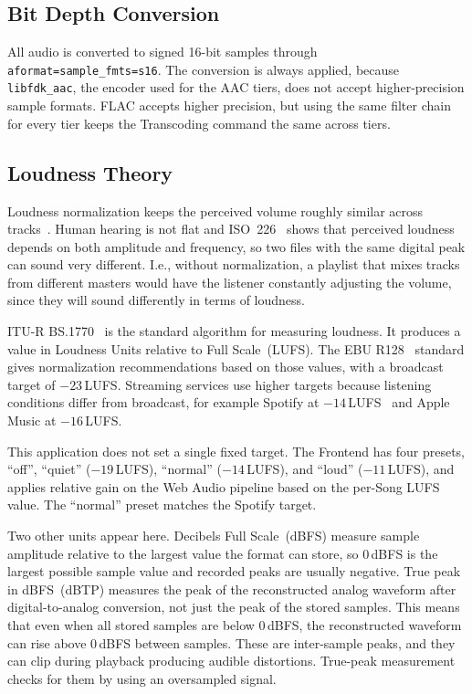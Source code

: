 \subsection{Bit Depth Conversion}
All audio is converted to signed 16-bit samples through
\texttt{aformat=sample\_fmts=s16}. The conversion is always applied,
because \texttt{libfdk\_aac}, the encoder used for the AAC tiers,
does not accept higher-precision sample formats. FLAC accepts higher
precision, but using the same filter chain for every tier keeps the
Transcoding command the same across tiers.

\subsection{Loudness Theory}
Loudness normalization keeps the perceived volume roughly similar across
tracks~\parencite{audio_normalization}. Human hearing is not flat and
ISO~226~\parencite{iso226} shows that perceived loudness depends on both amplitude
and frequency, so two files with the same digital peak can sound
very different. I.e., without normalization, a playlist that mixes tracks
from different masters would have the listener constantly adjusting the volume, since they will
sound differently in terms of loudness.

ITU-R BS.1770~\parencite{itu_bs1770} is the standard algorithm for measuring
loudness. It produces a value in Loudness Units relative to Full
Scale~(LUFS). The EBU R128~\parencite{ebu_r128} standard gives normalization
recommendations based on those values, with a broadcast target of
\(-23\)\,LUFS\@. Streaming services use higher targets because listening
conditions differ from broadcast, for example Spotify at
\(-14\)\,LUFS~\parencite{spotify_loudness} and Apple Music at
\(-16\)\,LUFS\@.~\parencite{apple_music_loudness}

This application does not set a single fixed target. The Frontend has
four presets, ``off'', ``quiet'' (\(-19\)\,LUFS), ``normal''
(\(-14\)\,LUFS), and ``loud'' (\(-11\)\,LUFS), and applies relative gain on
the Web Audio pipeline based on the per-Song LUFS value.
The ``normal'' preset matches the Spotify target.

Two other units appear here. Decibels Full Scale~(dBFS) measure
sample amplitude relative to the largest value the format can store,
so 0\,dBFS is the largest possible sample value and recorded peaks
are usually negative. True peak in dBFS~(dBTP) measures the peak of
the reconstructed analog waveform after digital-to-analog conversion,
not just the peak of the stored samples.
This means that even when all stored samples are below 0\,dBFS, the
reconstructed waveform can rise above 0\,dBFS between samples. These
are inter-sample peaks, and they can clip during playback producing audible distortions.
True-peak measurement checks for them by using an oversampled signal.

